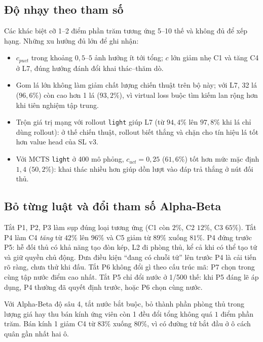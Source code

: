\subsection{Độ nhạy theo tham số}




Các khác biệt cỡ 1--2 điểm phần trăm tương ứng 5--10 thế và không đủ để xếp hạng. Những xu hướng đủ lớn để ghi nhận:
\begin{itemize}
  \item $c_{puct}$ trong khoảng $0{,}5$--$5$ ảnh hưởng ít tới tổng; $c$ lớn giảm nhẹ C1 và tăng C4 ở L7, đúng hướng đánh
  đổi khai thác--thăm dò.
  \item Gom lá lớn không làm giảm chất lượng chiến thuật trên bộ này; với L7, 32 lá ($96{,}6\%$) còn cao hơn 1 lá
  ($93{,}2\%$), vì virtual loss buộc tìm kiếm lan rộng hơn khi tiên nghiệm tập trung.
  \item Trộn giá trị mạng với rollout \texttt{light} giúp L7 (từ $94{,}4\%$ lên $97{,}8\%$ khi lá chỉ dùng rollout): ở thế
  chiến thuật, rollout biết thắng và chặn cho tín hiệu lá tốt hơn value head của SL v3.
  \item Với MCTS \texttt{light} ở 400 mô phỏng, $c_{uct}=0{,}25$ ($61{,}6\%$) tốt hơn mức mặc định $1{,}4$ ($50{,}2\%$): khai
  thác nhiều hơn giúp dồn lượt vào đáp trả thắng ở nút đối thủ.
\end{itemize}

\subsection{Bỏ từng luật và đổi tham số Alpha-Beta}


Tắt P1, P2, P3 làm sụp đúng loại tương ứng (C1 còn $2\%$, C2 $12\%$, C3 $65\%$). Tắt P4 làm C4 \emph{tăng} từ $42\%$ lên
$96\%$ và C5 giảm từ $89\%$ xuống $81\%$. P4 đứng trước P5: hễ đối thủ có khả năng tạo đòn kép, L2 đi phòng thủ, kể cả
khi có thể tạo tứ và giữ quyền chủ động. Đưa điều kiện ``đang có chuỗi tứ'' lên trước P4 là cải tiến rõ ràng, chưa thử
khi đấu. Tắt P6 không đổi gì theo cấu trúc mã: P7 chọn trong cùng tập nước điểm cao nhất. Tắt P5 chỉ đổi nước ở 1/500 thế: khi P5
đáng lẽ áp dụng, P4 thường đã quyết định trước, hoặc P6 chọn cùng nước.

Với Alpha-Beta độ sâu 4, tắt nước bắt buộc, bỏ thành phần phòng thủ trong lượng giá hay thu bán kính ứng viên còn 1 đều
đổi tổng không quá $1$ điểm phần trăm. Bán kính 1 giảm C4 từ $83\%$ xuống $80\%$, vì có đường tứ bắt đầu ở ô cách quân
gần nhất hai ô.
